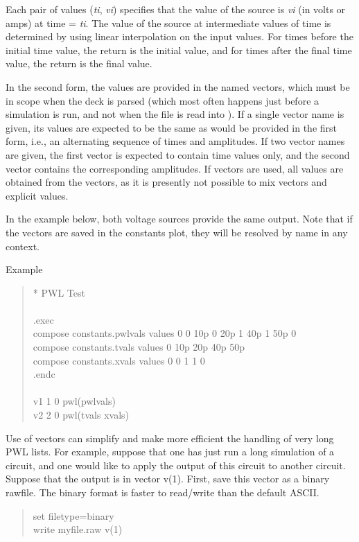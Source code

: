 Each pair of values ({\it ti\/}, {\it vi\/}) specifies that the value of the
source is {\it vi\/} (in volts or amps) at time = {\it ti\/}.  The
value of the source at intermediate values of time is determined by
using linear interpolation on the input values.  For times before the
initial time value, the return is the initial value, and for times
after the final time value, the return is the final value.

In the second form, the values are provided in the named vectors,
which must be in scope when the deck is parsed (which most often
happens just before a simulation is run, and not when the file is read
into {\WRspice}).  If a single vector name is given, its values are
expected to be the same as would be provided in the first form, i.e.,
an alternating sequence of times and amplitudes.  If two vector names
are given, the first vector is expected to contain time values only,
and the second vector contains the corresponding amplitudes.  If
vectors are used, all values are obtained from the vectors, as it is
presently not possible to mix vectors and explicit values.

In the example below, both voltage sources provide the same output. 
Note that if the vectors are saved in the {\vt constants} plot, they
will be resolved by name in any context.

Example
\begin{quote}\vt
* PWL Test\\
\\
.exec\\
compose constants.pwlvals values 0 0 10p 0 20p 1 40p 1 50p 0\\
compose constants.tvals values 0 10p 20p 40p 50p\\
compose constants.xvals values 0 0 1 1 0\\
.endc\\
\\
v1 1 0 pwl(pwlvals)\\
v2 2 0 pwl(tvals xvals)
\end{quote}

Use of vectors can simplify and make more efficient the handling of
very long PWL lists.  For example, suppose that one has just run a
long simulation of a circuit, and one would like to apply the output
of this circuit to another circuit.  Suppose that the output is in
vector {\vt v(1)}.  First, save this vector as a binary rawfile.  The
binary format is faster to read/write than the default ASCII.

\begin{quote}\vt
set filetype=binary\\
write myfile.raw v(1)
\end{quote}

